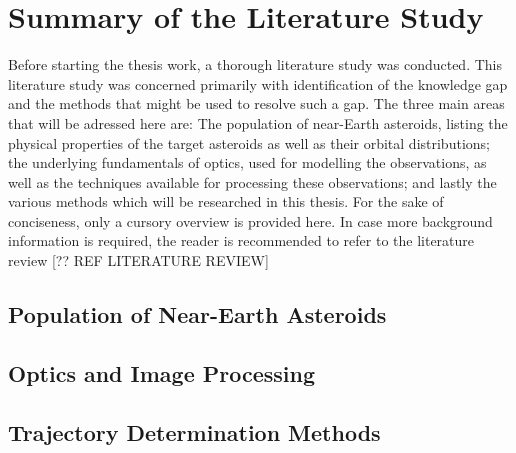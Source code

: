 \chapter{Summary of the Literature Study}

Before starting the thesis work, a thorough literature study was conducted. This literature study was concerned primarily with identification of the knowledge gap and the methods that might be used to resolve such a gap. The three main areas that will be adressed here are: The population of near-Earth asteroids, listing the physical properties of the target asteroids as well as their orbital distributions; the underlying fundamentals of optics, used for modelling the observations, as well as the techniques available for processing these observations; and lastly the various methods which will be researched in this thesis. For the sake of conciseness, only a cursory overview is provided here. In case more background information is required, the reader is recommended to refer to the literature review [?? REF LITERATURE REVIEW]

\section{Population of Near-Earth Asteroids}



\section{Optics and Image Processing}

\section{Trajectory Determination Methods}
